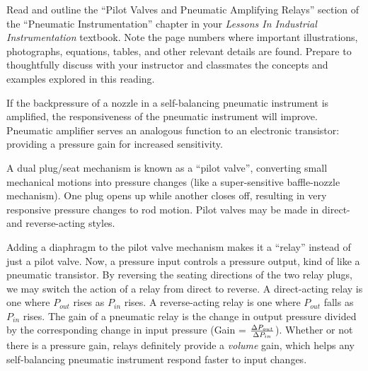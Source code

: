 

Read and outline the ``Pilot Valves and Pneumatic Amplifying Relays'' section of the ``Pneumatic Instrumentation'' chapter in your {\it Lessons In Industrial Instrumentation} textbook.  Note the page numbers where important illustrations, photographs, equations, tables, and other relevant details are found.  Prepare to thoughtfully discuss with your instructor and classmates the concepts and examples explored in this reading.















If the backpressure of a nozzle in a self-balancing pneumatic instrument is amplified, the responsiveness of the pneumatic instrument will improve.  Pneumatic amplifier serves an analogous function to an electronic transistor: providing a pressure gain for increased sensitivity.

\vskip 10pt

A dual plug/seat mechanism is known as a ``pilot valve'', converting small mechanical motions into pressure changes (like a super-sensitive baffle-nozzle mechanism).  One plug opens up while another closes off, resulting in very responsive pressure changes to rod motion.  Pilot valves may be made in direct- and reverse-acting styles.

\vskip 10pt

Adding a diaphragm to the pilot valve mechanism makes it a ``relay'' instead of just a pilot valve.  Now, a pressure input controls a pressure output, kind of like a pneumatic transistor.  By reversing the seating directions of the two relay plugs, we may switch the action of a relay from direct to reverse.  A direct-acting relay is one where $P_{out}$ rises as $P_{in}$ rises.  A reverse-acting relay is one where $P_{out}$ falls as $P_{in}$ rises.  The gain of a pneumatic relay is the change in output pressure divided by the corresponding change in input pressure (Gain = $\Delta P_{out} \over \Delta P_{in}$).  Whether or not there is a pressure gain, relays definitely provide a {\it volume} gain, which helps any self-balancing pneumatic instrument respond faster to input changes.

